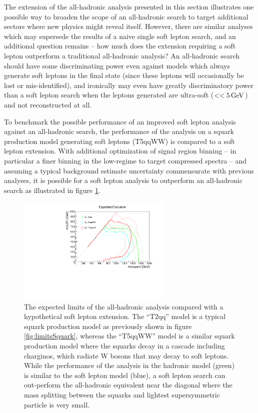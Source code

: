 The extension of the all-hadronic analysis presented in this section illustrates one possible way to broaden the scope of an all-hadronic search to target additional sectors where new physics might reveal itself. However, there are similar analyses which may supersede the results of a naive single soft lepton search, and an additional question remains -- how much does the extension requiring a soft lepton outperform a traditional all-hadronic analysis? An all-hadronic search should have some discriminating power even against models which always generate soft leptons in the final state (since these leptons will occasionally be lost or mis-identified), and ironically may even have greatly discriminatory power than a soft lepton search when the leptons generated are ultra-soft (\pt $<<5\,\text{Ge\hspace{-.08em}V}$) and not reconstructed at all.

To benchmark the possible performance of an improved soft lepton analysis against an all-hadronic search, the performance of the \mttwo analysis on a squark production model generating soft leptons (T5qqWW) is compared to a soft lepton extension. With additional optimization of signal region binning -- in particular a finer binning in the low-\MET regime to target compressed spectra -- and assuming a typical background estimate uncertainty commensurate with previous analyses, it is possible for a soft lepton analysis to outperform an all-hadronic search as illustrated in figure \ref{fig:softfuture}. 
\begin{figure}
	\centering
	\includegraphics[width=0.65\textwidth]{soft/figs/expectedSoftLimit.pdf}
	\caption{The expected limits of the all-hadronic \mttwo analysis compared with a hypothetical soft lepton extension. The ``T2qq'' model is a typical squark production model as previously shown in figure \ref{fig:limitsSquark}, whereas the ``T5qqWW'' model is a similar squark production model where the squarks decay in a cascade including charginos, which radiate W bosons that may decay to soft leptons. While the performance of the \mttwo analysis in the hadronic model (green) is similar to the soft lepton model (blue), a soft lepton search can out-perform the all-hadronic equivalent near the diagonal where the mass splitting between the squarks and lightest supersymmetric particle is very small.}
	\label{fig:softfuture}
\end{figure}

